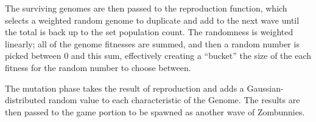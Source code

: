 \documentclass[letterpaper]{article}
\begin{document}
The surviving genomes are then passed to the reproduction function, which
selects a weighted random genome to duplicate and add to the next wave until
the total is back up to the set population count. The randomness is weighted
linearly; all of the genome fitnesses are summed, and then a random number is
picked between 0 and this sum, effectively creating a ``bucket'' the size of the
each fitness for the random number to choose between.

The mutation phase takes the result of reproduction and adds a
Gaussian-distributed random value to each characteristic of the Genome. The
results are then passed to the game portion to be spawned as another wave of
Zombunnies.

\end{document}
